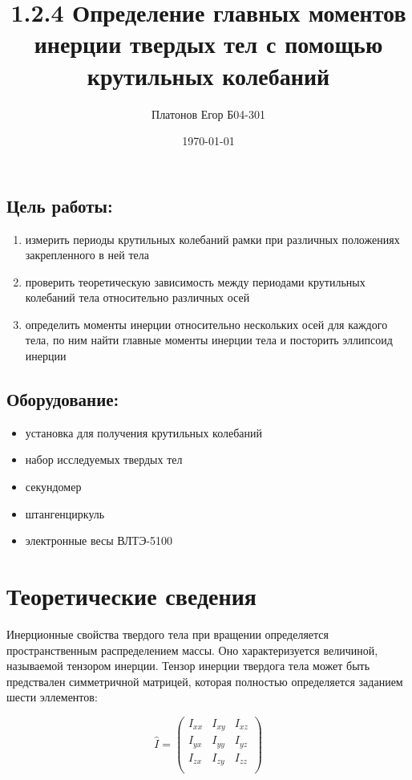 \documentclass[a4paper, 12pt]{article}
\author{Платонов Егор Б04-301}
\title{1.2.4 Определение главных моментов инерции твердых тел с помощью крутильных колебаний}
\date{\today}
\begin{document}
\maketitle

\subsection*{Цель работы:} 
\begin{enumerate}
	\item измерить периоды крутильных колебаний рамки при различных положениях закрепленного в ней тела
	\item проверить теоретическую зависимость между периодами крутильных колебаний тела относительно различных осей
        \item определить моменты инерции относительно нескольких осей для каждого тела, по ним найти главные моменты инерции тела и посторить эллипсоид инерции
\end{enumerate}

\subsection*{Оборудование:} 
\begin{itemize}
    \item установка для получения крутильных колебаний
    \item набор исследуемых твердых тел
    \item секундомер
    \item штангенциркуль
    \item электронные весы ВЛТЭ-5100
\end{itemize}
\medskip


\section{Теоретические сведения}

Инерционные свойства твердого тела при вращении определяется
пространственным распределением массы. Оно характеризуется величиной, называемой тензором инерции. Тензор инерции твердога тела может быть предствален симметричной матрицей, которая полностью определяется заданием шести эллементов:

\begin{equation*}
\hat{I} = \left(
\begin{array}{ccc}
I_{xx} & I_{xy} & I_{xz} \\
I_{yx} & I_{yy} & I_{yz} \\
I_{zx} & I_{zy} & I_{zz} \\
\end{array}
\right)
\end{equation*}
\end{document}

